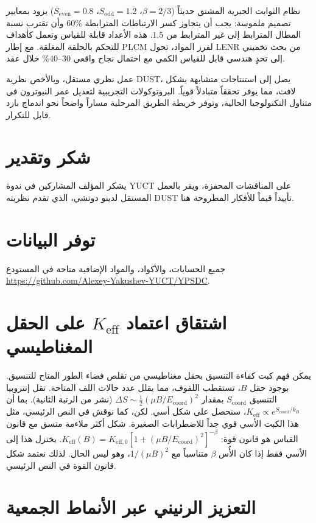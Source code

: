 \documentclass[11pt,a4paper]{article}
\newcommand{\Keff}{K_{\mathrm{eff}}}
\newcommand{\Keffzero}{K_{\mathrm{eff},0}}
\newcommand{\Sodd}{S_{\mathrm{odd}}}
\newcommand{\Seven}{S_{\mathrm{even}}}
\theoremstyle{remark}
\begin{document}
	نظام الثوابت الجبرية المشتق حديثاً (\(\beta=2/3\)، \(\Sodd=1.2\)، \(\Seven=0.8\)) يزود بمعايير تصميم ملموسة: يجب أن يتجاوز كسر الارتباطات المترابطة \(60\%\) وأن تقترب نسبة المطال المترابط إلى غير المترابط من \(1.5\). هذه الأعداد قابلة للقياس وتعمل كأهداف للتحكم بالحلقة المغلقة. مع إطار PLCM لفرز المواد، تحول LENR من بحث تخميني إلى تحدٍ هندسي قابل للقياس الكمي مع احتمال نجاح واقعي 30–40\% خلال عقد.
	
	عمل نظري مستقل، وبالأخص نظرية DUST، يصل إلى استنتاجات متشابهة بشكل لافت، مما يوفر تحققاً متبادلاً قوياً. البروتوكولات التجريبية لتعديل عمر النيوترون في متناول التكنولوجيا الحالية، وتوفر خريطة الطريق المرحلية مساراً واضحاً نحو اندماج بارد قابل للتكرار.
	
	\section*{شكر وتقدير}
	يشكر المؤلف المشاركين في ندوة YUCT على المناقشات المحفزة، ويقر بالعمل المستقل لدينو دوتشي، الذي تقدم نظريته DUST تأييداً قيماً للأفكار المطروحة هنا.
	
	\section*{توفر البيانات}
	جميع الحسابات، والأكواد، والمواد الإضافية متاحة في المستودع \url{https://github.com/Alexey-Yakushev-YUCT/YPSDC}.
	
	\appendix
	\section{اشتقاق اعتماد \(\Keff\) على الحقل المغناطيسي}
	\label{app:B}
	
	يمكن فهم كبت كفاءة التنسيق بحقل مغناطيسي من تقلص فضاء الطور المتاح للتنسيق. بوجود حقل \(B\)، تستقطب اللفوف، مما يقلل عدد حالات اللف المتاحة. تقل إنتروبيا التنسيق \(S_{\text{coord}}\) بمقدار \(\Delta S \sim \frac{1}{2} (\mu B / E_{\mathrm{coord}})^2\) (نشر من الرتبة الثانية). بما أن \(\Keff \propto e^{S_{\text{coord}}/k_B}\)، سنحصل على شكل أسي. لكن، كما نوقش في النص الرئيسي، مثل هذا الكبت الأسي قوي جداً للاضطرابات الصغيرة. شكل أكثر ملاءمة متسق مع قانون القياس هو قانون قوة: \(\Keff(B) = \Keffzero [1 + (\mu B/E_{\mathrm{coord}})^2]^{-\beta}\). يختزل هذا إلى الأسي فقط إذا كان الأُس \(\beta\) متناسباً مع \(1/(\mu B)^2\)، وهو ليس الحال. لذلك نعتمد شكل قانون القوة في النص الرئيسي.
	
	\section{التعزيز الرنيني عبر الأنماط الجمعية}
	\label{app:resonance}
	
\end{document}
